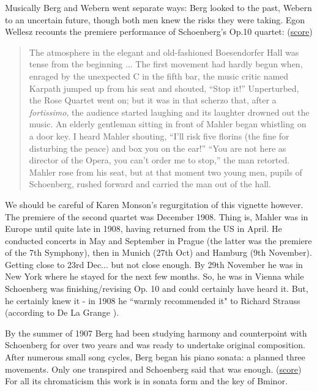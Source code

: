 Musically Berg and Webern went separate ways: Berg looked to the past, Webern to an uncertain future, though both men knew the risks they were taking. Egon Wellesz recounts the premiere performance of Schoenberg's Op.10 quartet: (\href{http://conquest.imslp.info/files/imglnks/usimg/c/c1/IMSLP29725-PMLP66179-Schoenberg_-_SQ_No._2_score.pdf}{score})

\begin{quotation}
The atmosphere in the elegant and old-fashioned Boesendorfer Hall was tense from the beginning ... The first 
movement had hardly begun when, enraged by the unexpected C in the fifth bar, the music critic named Karpath 
jumped up from his seat and shouted, ``Stop it!'' Unperturbed, the Rose Quartet went on; but it was in that 
scherzo that, after a \textit{fortissimo}, the audience started laughing and its laughter drowned out the 
music. An elderly gentleman sitting in front of Mahler began whistling on a door key. I heard Mahler 
shouting, ``I'll risk five florins (the fine for disturbing the peace) and box you on the ear!'' ``You are 
not here as director of the Opera, you can't order me to stop,'' the man retorted. Mahler rose from his seat, 
but at that moment two young men, pupils of Schoenberg, rushed forward and carried the man out of the hall.
\citep[p32]{monson1979alban}
\end{quotation} 

We should be careful of Karen Monson's  regurgitation of this vignette however. The premiere of the second 
quartet was December 1908. Thing is, Mahler was in Europe until quite late in 1908, having returned from the 
US in April. He conducted concerts in May and September in Prague (the latter was the premiere of the 7th 
Symphony), then in Munich (27th Oct) and Hamburg (9th November). Getting close to 23rd Dec... but not close 
enough. By 29th November he was in New York where he stayed for the next few months. So, he was in Vienna 
while Schoenberg was finishing/revising Op. 10 and could certainly have heard it. But, he certainly knew it - 
in 1908 he ``warmly recommended it" to Richard Strauss (according to De La Grange \citeyearpar{de2007gustav}). 

By the summer of 1907 Berg had been studying harmony and counterpoint with Schoenberg for over two years and was ready to undertake original composition. After numerous small song cycles, Berg began his piano sonata: a planned three movements. Only one transpired and Schoenberg said that was enough. (\href{http://petrucci.mus.auth.gr/imglnks/usimg/7/75/IMSLP234327-SIBLEY1802.21900.4ff7-39087012041663score.pdf}{score})
For all its chromaticism this work is in sonata form and the key of Bminor. 

